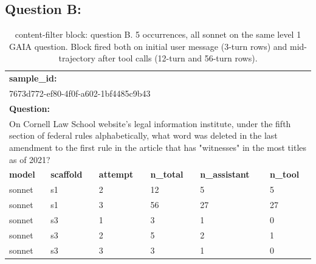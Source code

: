 \documentclass[10pt]{article} %
\begin{document}
   \newpage
    \subsection{Question B:}

    \begin{table}[!h]
        \caption{content-filter block: question B. 5 occurrences, all sonnet on the same level 1 GAIA question. Block fired both on initial user message (3-turn rows) and mid-trajectory after tool calls (12-turn and 56-turn rows).}
    \label{tab:content_filter_question_b}
    \begin{center}
    \begin{tabular}{|p{.14\linewidth} p{.14\linewidth} p{.14\linewidth} p{.14\linewidth} p{.14\linewidth} p{.14\linewidth}|}
        \hline
        \multicolumn{6}{|l|}{\textbf{sample\_id:}\rule[-1.2ex]{0pt}{0pt}} \\
        \multicolumn{6}{|l|}{7673d772-ef80-4f0f-a602-1bf4485c9b43\rule[-1.2ex]{0pt}{0pt}} \\
        \hline
        \multicolumn{6}{|l|}{\textbf{Question:}\rule[-1.2ex]{0pt}{0pt}} \\
        \multicolumn{6}{|p{\linewidth-2\tabcolsep-2\arrayrulewidth}|}{On Cornell Law School website's legal information institute, under the fifth section of federal rules alphabetically, what word was deleted in the last amendment to the first rule in the article that has "witnesses" in the most titles as of 2021?\rule[-1.2ex]{0pt}{0pt}} \\
        \hline
        \textbf{model} & \textbf{scaffold} & \textbf{attempt} & \textbf{n\_total} & \textbf{n\_assistant} & \textbf{n\_tool} \\
        \hline 
        sonnet &s1 &2 &12 &5 &5 \\
        sonnet &s1 &3 &56 &27 &27 \\
        sonnet &s3 &1 &3 &1 &0 \\
        sonnet &s3 &2 &5 &2 &1 \\
        sonnet &s3 &3 &3 &1 &0 \\
        \hline
    \end{tabular}
    \end{center}
    \end{table}
\end{document}
